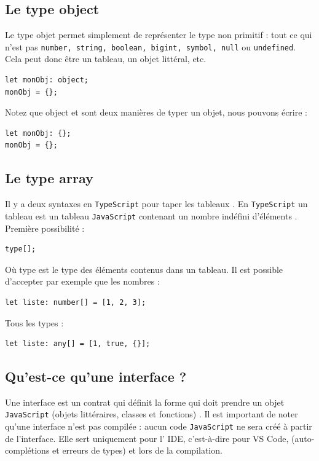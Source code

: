 \documentclass{article}
\begin{document}
\subsection{Le type {\color{monOrange}object}}
Le type {\color{monOrange}objet} permet simplement de représenter le type {\color{blue}non primitif} : tout ce qui n'est pas {\tt number, string, boolean, bigint, symbol, null} ou {\tt undefined}. Cela peut donc être un tableau, un objet littéral, etc.
\begin{verbatim}
let monObj: object;
monObj = {};
\end{verbatim}

Notez que {\color{monOrange}object} et {\color{monOrange}{}} sont deux manières de typer un objet, nous pouvons écrire :
\begin{verbatim}
let monObj: {};
monObj = {};
\end{verbatim}

\subsection{Le type {\color{monOrange}array}}
Il y a deux syntaxes en {\tt TypeScript} pour taper les {\color{monOrange}tableaux} . En {\tt TypeScript} un tableau est un tableau {\tt JavaScript} contenant un nombre indéfini d'éléments . Première possibilité :
\begin{verbatim}
type[];
\end{verbatim}

Où type est le type des éléments contenus dans un tableau. Il est possible d'accepter par exemple que les nombres :
\begin{verbatim}
let liste: number[] = [1, 2, 3];
\end{verbatim}
Tous les types :
\begin{verbatim}
let liste: any[] = [1, true, {}];
\end{verbatim}

\subsection{Qu'est-ce qu'une {\color{monOrange}interface} ?}
Une {\color{monOrange}interface} est un contrat qui définit la forme qui doit prendre un objet {\tt JavaScript} (objets littéraires, classes et fonctions) . Il est important de noter qu'une {\color{monOrange}interface} n'est pas compilée : aucun code {\tt JavaScript} ne sera créé à partir de l'interface. Elle sert uniquement pour l' IDE, c'est-à-dire pour {\color{blue}VS Code}, (auto-complétions et erreurs de types) et lors de la compilation.
\end{document}
